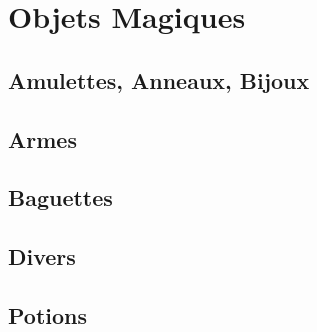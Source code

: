 \documentclass{dd}
\begin{document}
\chapter{Objets Magiques}

\section{Amulettes, Anneaux, Bijoux} \label{OMbijoux}




\section{Armes} \label{OMarmes}



\section{Baguettes} \label{OMbaguettes}


\section{Divers} \label{OMdivers}




\section{Potions} \label{potions}






 















 






\end{document}

